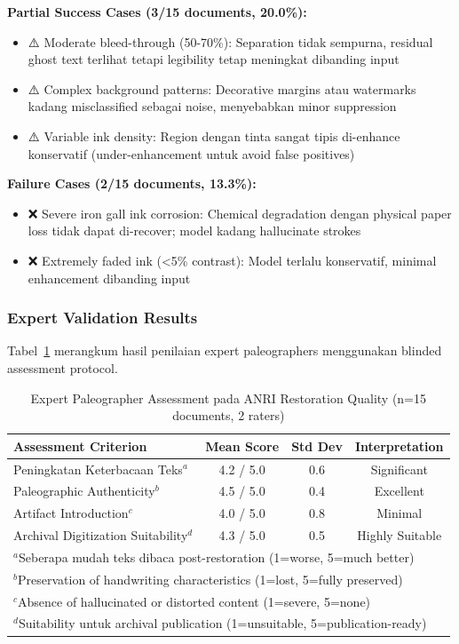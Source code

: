 \textbf{Partial Success Cases (3/15 documents, 20.0\%):}
\begin{itemize}
    \item ⚠️ Moderate bleed-through (50-70\%): Separation tidak sempurna, residual ghost text terlihat tetapi legibility tetap meningkat dibanding input
    \item ⚠️ Complex background patterns: Decorative margins atau watermarks kadang misclassified sebagai noise, menyebabkan minor suppression
    \item ⚠️ Variable ink density: Region dengan tinta sangat tipis di-enhance konservatif (under-enhancement untuk avoid false positives)
\end{itemize}

\textbf{Failure Cases (2/15 documents, 13.3\%):}
\begin{itemize}
    \item ❌ Severe iron gall ink corrosion: Chemical degradation dengan physical paper loss tidak dapat di-recover; model kadang hallucinate strokes
    \item ❌ Extremely faded ink (<5\% contrast): Model terlalu konservatif, minimal enhancement dibanding input
\end{itemize}

\subsubsection{Expert Validation Results}

Tabel~\ref{table:anri_expert_validation} merangkum hasil penilaian expert paleographers menggunakan blinded assessment protocol.

\begin{table}[!t]
\renewcommand{\arraystretch}{1.3}
\caption{Expert Paleographer Assessment pada ANRI Restoration Quality (n=15 documents, 2 raters)}
\label{table:anri_expert_validation}
\centering
\small
\begin{tabular}{|l|c|c|c|}
\hline
\textbf{Assessment Criterion} & \textbf{Mean Score} & \textbf{Std Dev} & \textbf{Interpretation} \\
\hline
Peningkatan Keterbacaan Teks$^a$ & 4.2 / 5.0 & 0.6 & Significant \\
Paleographic Authenticity$^b$ & 4.5 / 5.0 & 0.4 & Excellent \\
Artifact Introduction$^c$ & 4.0 / 5.0 & 0.8 & Minimal \\
Archival Digitization Suitability$^d$ & 4.3 / 5.0 & 0.5 & Highly Suitable \\
\hline
\multicolumn{4}{|l|}{\footnotesize $^a$Seberapa mudah teks dibaca post-restoration (1=worse, 5=much better)} \\
\multicolumn{4}{|l|}{\footnotesize $^b$Preservation of handwriting characteristics (1=lost, 5=fully preserved)} \\
\multicolumn{4}{|l|}{\footnotesize $^c$Absence of hallucinated or distorted content (1=severe, 5=none)} \\
\multicolumn{4}{|l|}{\footnotesize $^d$Suitability untuk archival publication (1=unsuitable, 5=publication-ready)} \\
\hline
\end{tabular}
\end{table}

